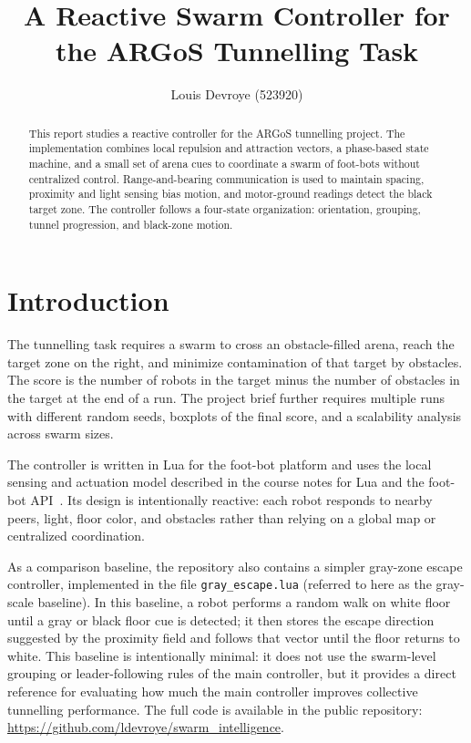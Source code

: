 \documentclass[runningheads]{llncs}
\begin{document}
\title{A Reactive Swarm Controller for the ARGoS Tunnelling Task}

\author{Louis Devroye (523920)}



\maketitle

\begin{abstract}
This report studies a reactive controller for the ARGoS tunnelling project.
The implementation combines local repulsion and attraction vectors, a
phase-based state machine, and a small set of arena cues to coordinate a swarm
of foot-bots without centralized control. Range-and-bearing communication is
used to maintain spacing, proximity and light sensing bias motion, and
motor-ground readings detect the black target zone. The controller follows a
four-state organization: orientation, grouping, tunnel progression, and
black-zone motion.
\end{abstract}

\section{Introduction}
The tunnelling task requires a swarm to cross an obstacle-filled arena, reach
the target zone on the right, and minimize contamination of that target by
obstacles. The score is the number of robots in the target minus the number of
obstacles in the target at the end of a run. The project brief further requires
multiple runs with different random seeds, boxplots of the final score, and a
scalability analysis across swarm sizes.

The controller is written in Lua for the foot-bot platform and uses the local
sensing and actuation model described in the course notes for Lua and the
foot-bot API~\cite{lua,footbot}. Its design is intentionally reactive: each
robot responds to nearby peers, light, floor color, and obstacles rather than
relying on a global map or centralized coordination.

As a comparison baseline, the repository also contains a simpler gray-zone
escape controller, implemented in the file \texttt{gray\_escape.lua} (referred
to here as the gray-scale baseline). In this baseline, a robot performs a
random walk on white floor until a gray or black floor cue is detected; it then
stores the escape direction suggested by the proximity field and follows that
vector until the floor returns to white. This baseline is intentionally minimal:
it does not use the swarm-level grouping or leader-following rules of the main
controller, but it provides a direct reference for evaluating how much the main
controller improves collective tunnelling performance. The full code is available
in the public repository: \url{https://github.com/ldevroye/swarm_intelligence}.
\end{document}
